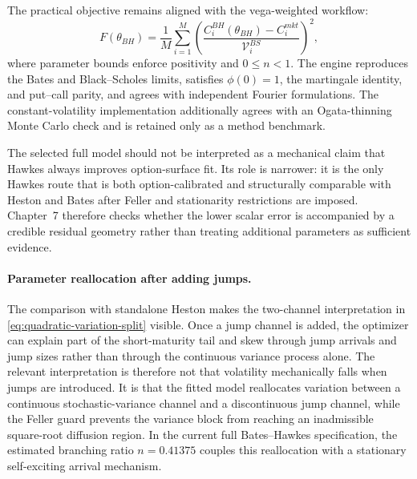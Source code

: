 \documentclass[a4paper,10pt,titlepage,oneside,openany]{book}
\theoremstyle{plain}
\theoremstyle{definition}
\theoremstyle{remark}
\newcommand{\vega}{\mathcal{V}}
\begin{document}
The practical objective remains aligned with the vega-weighted workflow:
\begin{equation}
    F(\theta_{BH})
    =
    \frac{1}{M}\sum_{i=1}^M
    \left(
        \frac{C_i^{BH}(\theta_{BH})-C_i^{mkt}}{\vega_i^{BS}}
    \right)^2,
    \label{eq:bates-hawkes-objective}
\end{equation}
where parameter bounds enforce positivity and \(0\leq n<1\). The engine reproduces the Bates and Black--Scholes limits, satisfies \(\phi(0)=1\), the martingale identity, and put--call parity, and agrees with independent Fourier formulations. The constant-volatility implementation additionally agrees with an Ogata-thinning Monte Carlo check and is retained only as a method benchmark.

The selected full model should not be interpreted as a mechanical claim that Hawkes always improves option-surface fit. Its role is narrower: it is the only Hawkes route that is both option-calibrated and structurally comparable with Heston and Bates after Feller and stationarity restrictions are imposed. Chapter~7 therefore checks whether the lower scalar error is accompanied by a credible residual geometry rather than treating additional parameters as sufficient evidence.

\paragraph{Parameter reallocation after adding jumps.}
The comparison with standalone Heston makes the two-channel interpretation in \eqref{eq:quadratic-variation-split} visible. Once a jump channel is added, the optimizer can explain part of the short-maturity tail and skew through jump arrivals and jump sizes rather than through the continuous variance process alone. The relevant interpretation is therefore not that volatility mechanically falls when jumps are introduced. It is that the fitted model reallocates variation between a continuous stochastic-variance channel and a discontinuous jump channel, while the Feller guard prevents the variance block from reaching an inadmissible square-root diffusion region. In the current full Bates--Hawkes specification, the estimated branching ratio \(n=0.41375\) couples this reallocation with a stationary self-exciting arrival mechanism.
\end{document}
